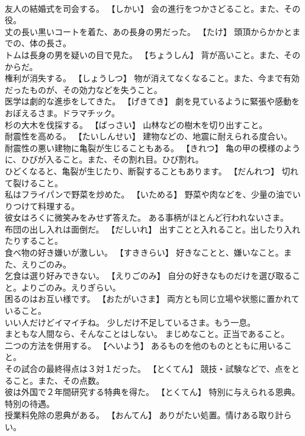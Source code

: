 \documentclass[8pt]{extreport}
\begin{document}
\begin{CJK}{UTF8}{min}
\\	友人の結婚式を司会する。	【しかい】 会の進行をつかさどること。また、その役。
\\	丈の長い黒いコートを着た、あの長身の男だった。	【たけ】 頭頂からかかとまでの、体の長さ。
\\	トムは長身の男を疑いの目で見た。	【ちょうしん】 背が高いこと。また、そのからだ。
\\	権利が消失する。	【しょうしつ】 物が消えてなくなること。また、今まで有効だったものが、その効力などを失うこと。
\\	医学は劇的な進歩をしてきた。	【げきてき】 劇を見ているように緊張や感動をおぼえるさま。ドラマチック。
\\	杉の大木を伐採する。	【ばっさい】 山林などの樹木を切り出すこと。
\\	耐震性を高める。	【たいしんせい】 建物などの、地震に耐えられる度合い。
\\	耐震性の悪い建物に亀裂が生じることもある。	【きれつ】 亀の甲の模様のように、ひびが入ること。また、その割れ目。ひび割れ。
\\	ひどくなると、亀裂が生じたり、断裂することもあります。	【だんれつ】 切れて裂けること。
\\	私はフライパンで野菜を炒めた。	【いためる】 野菜や肉などを、少量の油でいりつけて料理する。
\\	彼女はろくに微笑みをみせず答えた。	ある事柄がほとんど行われないさま。
\\	布団の出し入れは面倒だ。	【だしいれ】 出すことと入れること。出したり入れたりすること。
\\	食べ物の好き嫌いが激しい。	【すききらい】 好きなことと、嫌いなこと。また、えりごのみ。
\\	乞食は選り好みできない。	【えりごのみ】 自分の好きなものだけを選び取ること。よりごのみ。えりぎらい。
\\	困るのはお互い様です。	【おたがいさま】 両方とも同じ立場や状態に置かれていること。
\\	いい人だけどイマイチね。	少しだけ不足しているさま。もう一息。
\\	まともな人間なら、そんなことはしない。	まじめなこと。正当であること。
\\	二つの方法を併用する。	【へいよう】 あるものを他のものとともに用いること。
\\	その試合の最終得点は３対１だった。	【とくてん】 競技・試験などで、点をとること。また、その点数。
\\	彼は外国で２年間研究する特典を得た。	【とくてん】 特別に与えられる恩典。特別の待遇。
\\	授業料免除の恩典がある。	【おんてん】 ありがたい処置。情けある取り計らい。

\end{CJK}
\end{document}
